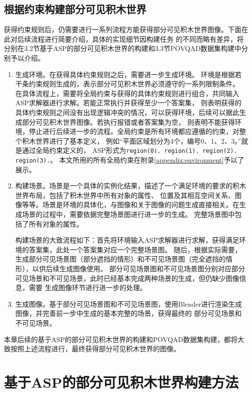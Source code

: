 \subsection{根据约束构建部分可见积木世界}
获得约束规则后，仍需要进行一系列流程方能获得部分可见积木世界图像。下面在此对后续流程进行简要介绍，具体的实现细节因构建任务
的不同而略有差异，将分别在3.2节基于ASP的部分可见积木世界的构建和3.3节POVQAD数据集构建中分别予以介绍。
\begin{enumerate}[nosep]
\item 生成环境。在获得具体约束规则之后，需要进一步生成环境。
环境是根据若干条约束规则生成的，表示部分可见积木世界必须遵守的一系列限制条件。
在具体流程上，需要将全局约束与获得的具体约束规则进行组合，共同输入ASP求解器进行求解。若能正常执行并获得至少一个答案集，
则表明获得的具体约束规则之间没有出现逻辑冲突的情况，可以获得环境，后续可以据此生成部分可见积木世界图像。若执行报错或者答案集为空，
则表明不能获得环境，停止进行后续进一步的流程。全局约束是所有环境都应遵循的约束，对整个积木世界进行了基本定义，
例如“平面区域划分为4个，编号0、1、2、3。”就是通过全局约束定义的，
ASP形式为\texttt{region(0). region(1). region(2). region(3).}。
本文所用的所有全局约束在附录\ref{appendix:environment}予以了展示。
\item 构建场景。场景是一个具体的实例化结果，描述了一个满足环境的要求的积木世界布局，包括了积木世界中所有对象的属性、
位置及其相互空间关系、图像等等。场景是环境的具体化，与图像和关于图像的问题生成直接相关。在生成场景的过程中，需要依据完整场景图进行进一步的生成。
完整场景图中包括了所有对象的属性。

构建场景的大致流程如下：首先将环境输入ASP求解器进行求解，获得满足环境的答案集，此处一个答案集对应一个完整场景图。
随后，根据实际需要，生成部分可见场景图（部分遮挡的情形）和不可见场景图（完全遮挡的情形），以供后续生成图像使用。
部分可见场景图和不可见场景图分别对应部分可见场景和不可见场景，此时已经基本完成两种场景的生成，但仍缺少图像信息，需要
生成图像环节进行进一步的处理。
\item 生成图像。基于部分可见场景图和不可见场景图，使用Blender进行渲染生成图像，并完善前一步中生成的基本完整的场景，获得最终的
部分可见场景和不可见场景。
\end{enumerate}

本章后续的基于ASP的部分可见积木世界的构建和POVQAD数据集构建，都将大致按照上述流程进行，最终获得部分可见积木世界的图像。
\section{基于ASP的部分可见积木世界构建方法}
